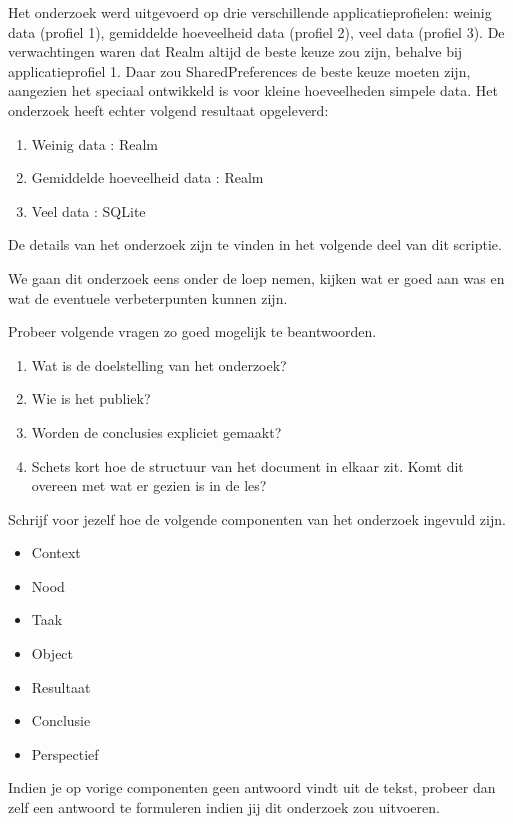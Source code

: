 \begin{displayquote}
 	
 	Het onderzoek werd uitgevoerd op drie verschillende applicatieprofielen: weinig data
 	(profiel 1), gemiddelde hoeveelheid data (profiel 2), veel data (profiel 3).
 	De verwachtingen waren dat Realm altijd de beste keuze zou zijn, behalve bij
 	applicatieprofiel 1. Daar zou SharedPreferences de beste keuze moeten zijn, aangezien
 	het speciaal ontwikkeld is voor kleine hoeveelheden simpele data. Het onderzoek heeft
 	echter volgend resultaat opgeleverd:
 	
 	\begin{enumerate}
 		\item Weinig data : Realm
 		\item Gemiddelde hoeveelheid data : Realm
 		\item Veel data : SQLite
 	\end{enumerate}
 	De details van het onderzoek zijn te vinden in het volgende deel van dit scriptie.
 \end{displayquote}
 
 We gaan dit onderzoek eens onder de loep nemen, kijken wat er goed aan was en wat de eventuele verbeterpunten kunnen zijn. 
 
\begin{exercise}
	Probeer volgende vragen zo goed mogelijk te beantwoorden.
	\begin{enumerate}
		\item Wat is de doelstelling van het onderzoek?
		\item Wie is het publiek?
		\item Worden de conclusies expliciet gemaakt? 
		\item Schets kort hoe de structuur van het document in elkaar zit. Komt dit overeen met wat er gezien is in de les?
	\end{enumerate}
\end{exercise}

\begin{exercise}
	Schrijf voor jezelf hoe de volgende componenten van het onderzoek ingevuld zijn.
	\begin{itemize}
		\item Context
		\item Nood
		\item Taak
		\item Object
		\item Resultaat
		\item Conclusie
		\item Perspectief
	\end{itemize}
\end{exercise}
Indien je op vorige componenten geen antwoord vindt uit de tekst, probeer dan zelf een antwoord te formuleren indien jij dit onderzoek zou uitvoeren. 

